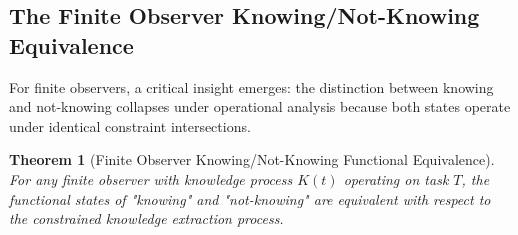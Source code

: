 \documentclass{article}
\newtheorem{theorem}{Theorem}[section]
\begin{document}
\subsection{The Finite Observer Knowing/Not-Knowing Equivalence}

For finite observers, a critical insight emerges: the distinction between knowing and not-knowing collapses under operational analysis because both states operate under identical constraint intersections.

\begin{theorem}[Finite Observer Knowing/Not-Knowing Functional Equivalence]
For any finite observer with knowledge process $K(t)$ operating on task $T$, the functional states of "knowing" and "not-knowing" are equivalent with respect to the constrained knowledge extraction process.
\end{theorem}
\end{document}
